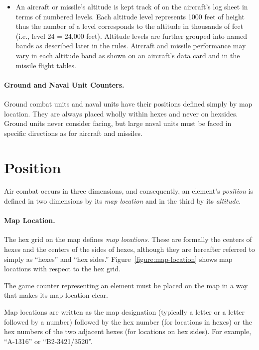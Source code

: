 {\begin{itemize}
    \item {} 
    An aircraft or missile's altitude is kept track of on the aircraft's log sheet in terms of numbered levels. Each altitude level represents 1000 feet of height thus the number of a level corresponds to the altitude in thousands of feet (i.e., level 24 = 24,000 feet). Altitude levels are further grouped into named bands as described later in the rules. Aircraft and missile performance may vary in each altitude band as shown on an aircraft's data card and in the missile flight tables.

\end{itemize}



\paragraph{Ground and Naval Unit Counters.}
Ground combat units and naval units have their positions defined simply by map location. They are always placed wholly within hexes and never on hexsides. Ground units never consider facing, but large naval units must be faced in specific directions as for aircraft and missiles.

}{
\section{Position}
\label{rule:position}

Air combat occurs in three dimensions, and consequently, an element’s \emph{position} is defined in two dimensions by its \emph{map location} and in the third by its \emph{altitude}.

\paragraph{Map Location.}\label{rule:map-location}

The hex grid on the map defines \emph{map locations}. These are formally the centers of hexes and the centers of the sides of hexes, although they are hereafter referred to simply as “hexes” and “hex sides.” Figure~\ref{figure:map-location} shows map locations with respect to the hex grid.

The game counter representing an element must be placed on the map in a way that makes its map location clear. 

Map locations are written as the map designation (typically a letter or a letter followed by a number) followed by the hex number (for locations in hexes) or the hex numbers of the two adjacent hexes (for locations on hex sides). For example, “A-1316” or “B2-3421/3520”.

}
